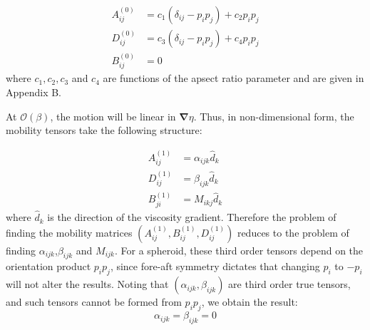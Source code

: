 \documentclass{jfm}
\begin{document}
\begin{subequations} \label{eq:mobility_tensor_leading_order}
\begin{align}
\label{eq:mobility_tensor_Newtonian_1}
   {A}^{(0)}_{ij} &= c_1\left(\delta_{ij}-{p_i}{p_j}\right)+c_2{p_i}{p_j}  \\  \label{eq:mobility_tensor_Newtonian_2}
   {D}^{(0)}_{ij} &= c_3\left(\delta_{ij}-{p_i}{p_j}\right)+c_4{p_i}{p_j}   \\
   {B}^{(0)}_{ij} &=0
\end{align}    
\end{subequations}
where $c_1,c_2,c_3$ and $c_4$ are functions of the apsect ratio parameter and are given in Appendix B.

At $\mathcal{O}(\beta)$, the motion will be linear in $\boldsymbol{\nabla} \eta$.  Thus, in non-dimensional form, the mobility tensors take the following structure:

\begin{subequations}
\begin{align}
    A_{ij}^{(1)} &=\alpha_{ijk}\hat{d}_k\\
    D_{ij}^{(1)} &=\beta_{ijk}\hat{d}_k \\ 
     B_{ji}^{(1)} &= M_{ikj}\hat{d}_k 
\end{align}
\end{subequations}
where $\hat{d}_k$ is the direction of the viscosity gradient.  Therefore the problem of finding the mobility matrices $(A_{ij}^{(1)},B_{ij}^{(1)}, {D}_{ij}^{(1)})$ reduces to the problem of finding $\alpha_{ijk}$,$\beta_{ijk}$ and $M_{ijk}$. For a spheroid, these third order tensors depend on the orientation product $p_ip_j$, since fore-aft symmetry dictates that changing $p_i$ to $-p_i$ will not alter the results. Noting that $(\alpha_{ijk}, \beta_{ijk})$ are third order true tensors, and such tensors cannot be formed from $p_i p_j$, we obtain the result:
\begin{equation}
   \alpha_{ijk} = \beta_{ijk} =0
\end{equation}
\end{document}
